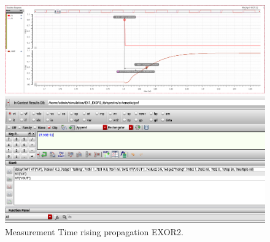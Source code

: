 \begin{figure}[H]
	\begin{minipage}{0.5\linewidth}
		\includegraphics[width=\linewidth]{section/EX1/EXOR/EX1_EXOR2_Tpdr_Waveform.png}
	\end{minipage}
	\begin{minipage}{0.5\linewidth}
		\includegraphics[width=\linewidth]{section/EX1/EXOR/EX1_EXOR2_Tpdr_Cal.png}
	\end{minipage}
	\caption{Measurement Time rising propagation EXOR2.}
\end{figure}

